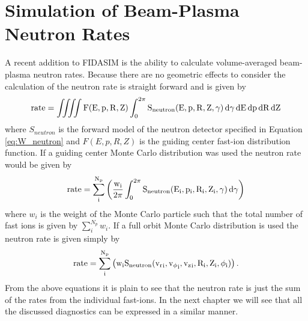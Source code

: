 \section{Simulation of Beam-Plasma Neutron Rates}
A recent addition to FIDASIM is the ability to calculate volume-averaged beam-plasma neutron rates. Because there are no geometric effects to consider the calculation of the neutron rate is straight forward and is given by
\begin{equation}\label{eq:neutron_rate_f}
    \rm{rate} = \iiiint F(E,p,R,Z) \int_0^{2\pi} S_{neutron}(E,p,R,Z,\gamma) \,d\gamma\,dE\,dp\,dR\,dZ
\end{equation}
where $S_{neutron}$ is the forward model of the neutron detector specified in Equation \ref{eq:W_neutron} and $F(E,p,R,Z)$ is the guiding center fast-ion distribution function.
If a guiding center Monte Carlo distribution was used the neutron rate would be given by
\begin{equation}\label{eq:neutron_rate_gcmc}
    \rm{rate} = \sum_i^{N_p}\left (\frac{w_i}{2\pi} \int_0^{2\pi}  S_{neutron}(E_i,p_i,R_i,Z_i,\gamma) \,d\gamma \right )
\end{equation}
where $w_i$ is the weight of the Monte Carlo particle such that the total number of fast ions is given by $\sum_i^{N_p} w_i$. If a full orbit Monte Carlo distribution is used the neutron rate is given simply by
\begin{equation}\label{eq:neutron_rate_fomc}
    \rm{rate} = \sum_i^{N_p}\left (w_i S_{neutron}({v_r}_i,{v_\phi}_i,{v_z}_i,R_i,Z_i,\phi_i) \right ).
\end{equation}
From the above equations it is plain to see that the neutron rate is just the sum of the rates from the individual fast-ions. In the next chapter we will see that all the discussed diagnostics can be expressed in a similar manner.